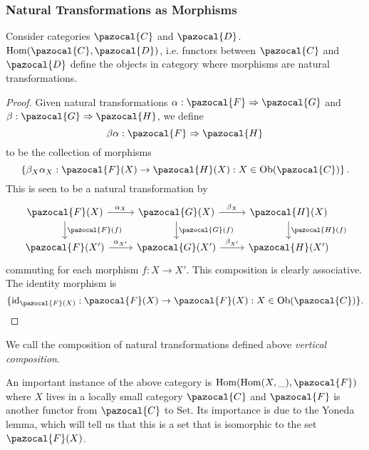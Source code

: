 \subsubsection{Natural Transformations as Morphisms}
\begin{proposition}
    Consider categories $\pazocal{C}$ and $\pazocal{D}$. $\Hom(\pazocal{C},\pazocal{D})$, i.e. functors between $\pazocal{C}$ and $\pazocal{D}$ define the objects in category where morphisms are natural transformations.
\end{proposition}
\begin{proof}
    Given natural transformations $\alpha: \pazocal{F} \Rightarrow \pazocal{G}$ and $\beta : \pazocal{G}\Rightarrow \pazocal{H}$, we define 
    $$\beta\alpha : \pazocal{F} \Rightarrow \pazocal{H}$$
    to be the collection of morphisms
    $$\left\{\beta_{X}\alpha_X : \pazocal{F}(X)\rightarrow \pazocal{H}(X) : X\in \Ob(\pazocal{C})\right\}.$$
    This is seen to be a natural transformation by  
    $$
        \begin{tikzcd}
            \pazocal{F}(X) \arrow[r, "\alpha_X"] \arrow[d,"\pazocal{F}(f)"] & \pazocal{G}(X)\arrow[d,"\pazocal{G}(f)"]\arrow[r,"\beta_X"] & \pazocal{H}(X)\arrow[d,"\pazocal{H}(f)"]\\
            \pazocal{F}(X') \arrow[r,"\alpha_{X'}"] & \pazocal{G}(X') \arrow[r,"\beta_{X'}"] & \pazocal{H}(X')
        \end{tikzcd}
    $$ 
    commuting for each morphism $f: X\rightarrow X'$. This composition is clearly associative. The identity morphism is 
    $$\{\id_{\pazocal{F}(X)}: \pazocal{F}(X)\rightarrow \pazocal{F}(X): X\in \Ob(\pazocal{C})\}.$$
\end{proof}
\begin{remark}
    We call the composition of natural transformations defined above \emph{vertical composition}.
\end{remark}
An important instance of the above category is $\Hom(\Hom(X,\_),\pazocal{F})$ where $X$ lives in a locally small category $\pazocal{C}$ and $\pazocal{F}$ is another functor from $\pazocal{C}$ to $\mathrm{Set}$. Its importance is due to the Yoneda lemma, which will tell us that this is a set that is isomorphic to the set $\pazocal{F}(X)$.  
